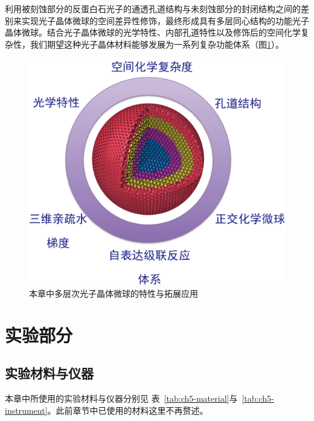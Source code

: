 利用被刻蚀部分的反蛋白石光子的通透孔道结构与未刻蚀部分的封闭结构之间的差别来实现光子晶体微球的空间差异性修饰，最终形成具有多层同心结构的功能光子晶体微球。结合光子晶体微球的光学特性、内部孔道特性以及修饰后的空间化学复杂性，我们期望这种光子晶体材料能够发展为一系列复杂功能体系（图\ref{fig:scheme-3-2}）。
\begin{figure}[htbp]
  \centering
  \includegraphics[width=0.6\linewidth]{figures/ch5/schem3-2.png}
  \caption{本章中多层次光子晶体微球的特性与拓展应用}
  \label{fig:scheme-3-2}
\end{figure}

\section{实验部分}
\label{sec:ch5-exp}

\subsection{实验材料与仪器}
本章中所使用的实验材料与仪器分别见
	表~\ref{tab:ch5-material}与~\ref{tab:ch5-instrument}。此前章节中已使用的材料这里不再赘述。

